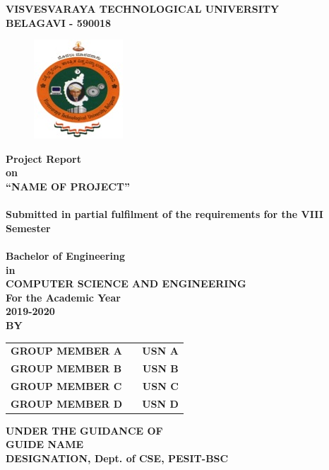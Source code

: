 \newpage
\begin{center}
	\thispagestyle{empty}
	\Large{\textbf{\color{myred}VISVESVARAYA TECHNOLOGICAL UNIVERSITY\\ \large{BELAGAVI - 590018}}}\\
	\begin{figure}[h]
		\centering
		\includegraphics[scale=0.8]{project/images/vtu_new_logo}
		\label{fig:vtulogo}
	\end{figure}
	\large{\textbf{Project Report\\ on \\}}
	\LARGE{\textsc {\textbf{\color{blue}``NAME OF PROJECT''}}}\\
	\large{\textbf{\\Submitted in partial fulfilment of the requirements for the VIII Semester\\}}
	\Large{\textbf{\\ \color{mygreen}Bachelor of Engineering \\ in \\ COMPUTER SCIENCE AND ENGINEERING\\ For the Academic Year \\ 2019-2020}}
	\Large{\textbf{\\BY}}\\
	\begin{table}[h]
		\centering
		\Large{
			\begin{tabular}{>{\bfseries}lc>{\bfseries}r}
				GROUP MEMBER A & & USN A\\GROUP MEMBER B & & USN B\\GROUP MEMBER C & & USN C\\GROUP MEMBER D & & USN D\\
		\end{tabular}}
	\end{table}
	\vspace{0.5cm}
	\large{\textbf{UNDER THE GUIDANCE OF}}\\ 
	\large{\textbf{\color{mygreen}GUIDE NAME}}\\
	\large{\textbf{\color{mygreen}DESIGNATION, Dept. of CSE, PESIT-BSC}}\\

\end{center}
